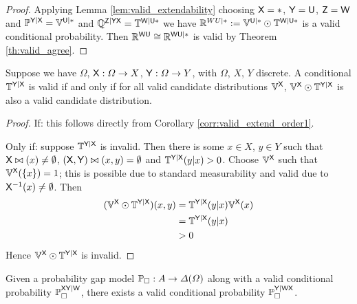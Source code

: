 \begin{proof}
Applying Lemma \ref{lem:valid_extendability} choosing $\mathsf{X}=*$, $\mathsf{Y}=\mathsf{U}$, $\mathsf{Z}=\mathsf{W}$ and $\mathbb{P}^{\mathsf{Y}|\mathsf{X}}=\mathbb{V}^{\mathsf{U}|*}$ and $\mathbb{Q}^{\mathsf{Z}|\mathsf{YX}}=\mathbb{T}^{\mathsf{W}|\mathsf{U*}}$ we have $\mathbb{R}^{WU|*}:=\mathbb{V}^{\mathsf{U}|*}\odot \mathbb{T}^{\mathsf{W}|\mathsf{U}*}$ is a valid conditional probability. Then $\mathbb{R}^{\mathsf{WU}}\cong \mathbb{R}^{\mathsf{WU}|*}$ is valid by Theorem \ref{th:valid_agree}.
\end{proof}

\begin{theorem}\label{th:valid_conditional_probability}
Suppose we have $\Omega$, $\mathsf{X}:\Omega\to X$, $\mathsf{Y}:\Omega\to Y$, with $\Omega$, $X$, $Y$ discrete. A conditional $\mathbb{T}^{\mathsf{Y}|\mathsf{X}}$ is valid if and only if for all valid candidate distributions $\mathbb{V}^{\mathsf{X}}$, $\mathbb{V}^{\mathsf{X}}\odot \mathbb{T}^{\mathsf{Y}|\mathsf{X}}$ is also a valid candidate distribution.
\end{theorem}

\begin{proof}
If: this follows directly from Corollary \ref{corr:valid_extend_order1}.

Only if: suppose $\mathbb{T}^{\mathsf{Y}|\mathsf{X}}$ is invalid. Then there is some $x\in X$, $y\in Y$ such that $\mathsf{X}\bowtie(x)\neq \emptyset$, $(\mathsf{X},\mathsf{Y})\bowtie(x,y)=\emptyset$ and $\mathbb{T}^{\mathsf{Y}|\mathsf{X}}(y|x)>0$. Choose $\mathbb{V}^{\mathsf{X}}$ such that $\mathbb{V}^{\mathsf{X}}(\{x\})=1$; this is possible due to standard measurability and valid due to $\mathsf{X}^{-1}(x)\neq \emptyset$. Then
\begin{align}
    (\mathbb{V}^{\mathsf{X}}\odot \mathbb{T}^{\mathsf{Y}|\mathsf{X}})(x,y) &= \mathbb{T}^{\mathsf{Y}|\mathsf{X}}(y|x) \mathbb{V}^{\mathsf{X}}(x)\\
                                                                     &= \mathbb{T}^{\mathsf{Y}|\mathsf{X}}(y|x)\\
                                                                     &>0
\end{align}
Hence $\mathbb{V}^{\mathsf{X}}\odot \mathbb{T}^{\mathsf{Y}|\mathsf{X}}$ is invalid.
\end{proof}

\begin{theorem}\label{th:valid_disint}
Given a probability gap model $\mathbb{P}_\square:A\to \Delta(\Omega)$ along with a valid conditional probability $\mathbb{P}_\square^{\mathsf{XY}|\mathsf{W}}$, there exists a valid conditional probability $\mathbb{P}_\square^{\mathsf{Y}|\mathsf{WX}}$.
\end{theorem}

